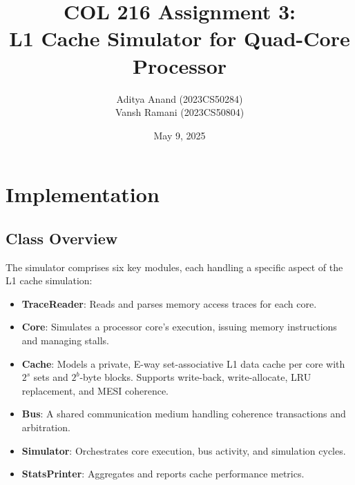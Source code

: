 \documentclass[11pt]{article}
\title{COL 216 Assignment 3: \\ L1 Cache Simulator for Quad-Core Processor}
\author{Aditya Anand (2023CS50284) \\ Vansh Ramani (2023CS50804)}
\date{May 9, 2025}
\begin{document}
\maketitle

\section{Implementation}

\subsection{Class Overview}
The simulator comprises six key modules, each handling a specific aspect of the L1 cache simulation:

\begin{itemize}
    \item \textbf{TraceReader}: Reads and parses memory access traces for each core.
    \item \textbf{Core}: Simulates a processor core's execution, issuing memory instructions and managing stalls.
    \item \textbf{Cache}: Models a private, E-way set-associative L1 data cache per core with $2^s$ sets and $2^b$-byte blocks. Supports write-back, write-allocate, LRU replacement, and MESI coherence.
    \item \textbf{Bus}: A shared communication medium handling coherence transactions and arbitration.
    \item \textbf{Simulator}: Orchestrates core execution, bus activity, and simulation cycles.
    \item \textbf{StatsPrinter}: Aggregates and reports cache performance metrics.
\end{itemize}
\end{document}
